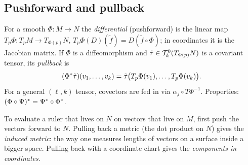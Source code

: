 \subsection{Pushforward and pullback}\label{sec:pushpull}
\begin{formal}
For a smooth $\Phi:M\to N$ the \emph{differential} (pushforward) is the linear map $T_p\Phi:T_pM\to T_{\Phi(p)}N$, $T_p\Phi(D)(\tilde f)=D(\tilde f\circ\Phi)$; in coordinates it is the Jacobian matrix. If $\Phi$ is a diffeomorphism and $\tilde\tau\in\mathcal{T}^{0}_{k}(T_{\Phi(p)}N)$ is a covariant tensor, its \emph{pullback} is
\[
(\Phi{}^{*}\tilde\tau)(v_1,\dots,v_k)=\tilde\tau\big(T_p\Phi(v_1),\dots,T_p\Phi(v_k)\big).
\]
For a general $(\ell,k)$ tensor, covectors are fed in via $\alpha_j\circ T\Phi^{-1}$. Properties: $(\Phi\circ\Psi){}^{*}=\Psi{}^{*}\circ\Phi{}^{*}$.
\end{formal}
\begin{intuition}[{pullback = ``transport the measuring device backwards''}]
To evaluate a ruler that lives on $N$ on vectors that live on $M$, first push the vectors forward to $N$. Pulling back a metric (the dot product on $N$) gives the \emph{induced metric}: the way one measures lengths of vectors on a surface inside a bigger space. Pulling back with a coordinate chart gives the \emph{components in coordinates}.
\end{intuition}

